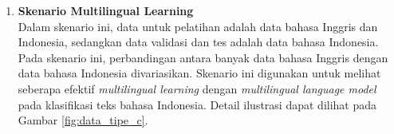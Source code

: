 \begin{enumerate}
		\item \textbf{Skenario Multilingual Learning}\\
		Dalam skenario ini, data untuk pelatihan adalah data bahasa Inggris dan Indonesia, sedangkan data validasi dan tes adalah data bahasa Indonesia. Pada skenario ini, perbandingan antara banyak data bahasa Inggris dengan data bahasa Indonesia divariasikan. Skenario ini digunakan untuk melihat seberapa efektif \textit{multilingual learning} dengan \textit{multilingual language model} pada klasifikasi teks bahasa Indonesia. Detail ilustrasi dapat dilihat pada Gambar \ref{fig:data_tipe_c}.
		
		
	\end{enumerate}


	